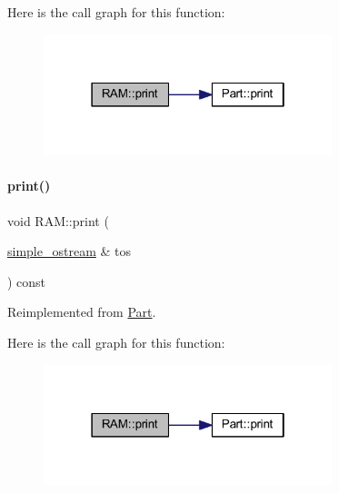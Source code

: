Here is the call graph for this function\+:
\nopagebreak
\begin{figure}[H]
\begin{center}
\leavevmode
\includegraphics[width=238pt]{class_r_a_m_a11a874dd6cf99454efd6b7a1d20a3737_cgraph}
\end{center}
\end{figure}
\mbox{\label{class_r_a_m_ac2d5a8bd858289b6679e429bbe15fb20}} 
\paragraph{\texorpdfstring{print()}{print()}\hspace{0.1cm}{\footnotesize\ttfamily [3/4]}}
{\footnotesize\ttfamily void R\+A\+M\+::print (\begin{DoxyParamCaption}\item[{\mbox{\hyperlink{structsimple__ostream}{simple\+\_\+ostream}} \&}]{tos }\end{DoxyParamCaption}) const\hspace{0.3cm}{\ttfamily [virtual]}}



Reimplemented from \mbox{\hyperlink{class_part_aa602d876151b63db72cf8f666847a8cd}{Part}}.

Here is the call graph for this function\+:
\nopagebreak
\begin{figure}[H]
\begin{center}
\leavevmode
\includegraphics[width=238pt]{class_r_a_m_ac2d5a8bd858289b6679e429bbe15fb20_cgraph}
\end{center}
\end{figure}
\mbox{\label{class_r_a_m_ad43f71c742f078c98ab7fd9a26420c97}} 
